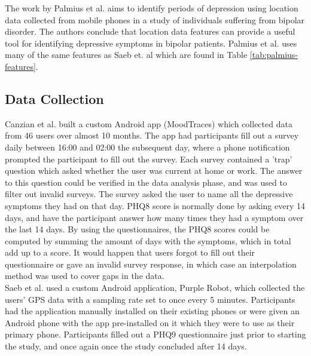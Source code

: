 

The work by Palmius et al. \cite{palmius2017} aims to identify periods of depression using location data collected from mobile phones in a study of individuals suffering from bipolar disorder. The authors conclude that location data features can provide a useful tool for identifying depressive symptoms in bipolar patients. Palmius et al. uses many of the same features as Saeb et. al \cite{Saeb2015, saeb2016} which are found in Table \ref{tab:palmius-features}.



\subsection{Data Collection}
Canzian et al. built a custom Android app (MoodTraces) which collected data from 46 users over almost 10 months. The app had participants fill out a survey daily between 16:00 and 02:00 the subsequent day, where a phone notification prompted the participant to fill out the survey. Each survey contained a 'trap' question which asked whether the user was current at home or work. The answer to this question could be verified in the data analysis phase, and was used to filter out invalid surveys. The survey asked the user to name all the depressive symptoms they had on that day. PHQ8 score is normally done by asking every 14 days, and have the participant answer how many times they had a symptom over the last 14 days. By using the questionnaires, the PHQ8 scores could be computed by summing the amount of days with the symptoms, which in total add up to a score. It would happen that users forgot to fill out their questionnaire or gave an invalid survey response, in which case an interpolation method was used to cover gaps in the data.\\

Saeb et al. used a custom Android application, Purple Robot, which collected the users' GPS data with a sampling rate set to once every 5 minutes. Participants had the application manually installed on their existing phones or were given an Android phone with the app pre-installed on it which they were to use as their primary phone. Participants filled out a PHQ9 questionnaire just prior to starting the study, and once again once the study concluded after 14 days.\\

 
